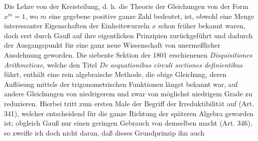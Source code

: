 \documentclass[11pt]{article}
\begin{document}
Die Lehre von der Kreisteilung, d. h. die Theorie der Gleichungen von der Form $x^m=1$, wo $m$ eine gegebene positive ganze Zahl bedeutet, ist, obwohl eine Menge interessanter Eigenschaften der Einheitswurzeln $x$ schon früher bekannt waren, doch erst durch Gauß auf ihre eigentlichen Prinzipien zurückgeführt und dadurch der Ausgangspunkt für eine ganz neue Wissenschaft von unermeßlicher Ausdehnung geworden. Die siebente Sektion der 1801 erschienenen \textit{Disquisitiones Arithmeticae}, welche den Titel \textit{De aequationibus circuli sectiones definientibus} führt, enthält eine rein algebraische Methode, die obige Gleichung, deren Auflösung mittels der trigonometrischen Funktionen längst bekannt war, auf andere Gleichungen von niedrigerem und zwar von möglichst niedrigem Grade zu reduzieren. Hierbei tritt zum ersten Male der Begriff der Irreduktibilität auf (Art. 341), welcher entscheidend für die ganze Richtung der späteren Algebra geworden ist; obgleich Gauß nur einen geringen Gebrauch von demselben macht (Art. 346), so zweifle ich doch nicht daran, daß dieses Grundprinzip ihn auch
\end{document}
